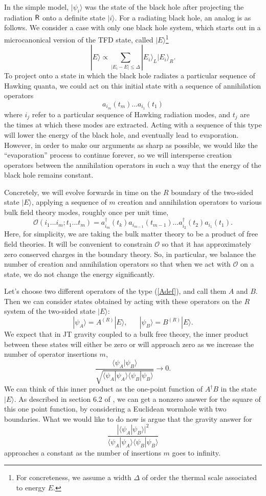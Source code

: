 \documentclass[11pt]{article}
\newcommand{\be}{\begin{equation}}
\newcommand{\ee}{\end{equation}}
\numberwithin{equation}{section}
\begin{document}
In the simple model, $|\psi_i\rangle$ was the state of the black hole after projecting the radiation $\sf{R}$ onto a definite state $|i\rangle$. For a radiating black hole, an analog is as follows. We consider a case with only one black hole system, which starts out in a microcanonical version of the TFD state, called $|E\rangle$\footnote{For concreteness, we assume a width $\Delta$ of order the thermal scale associated to energy $E$.}
\be
|E\rangle \propto \sum_{|E_i-E|\le \Delta}|E_i\rangle_L|E_i\rangle_{R}.
\ee
To project onto a state in which the black hole radiates a particular sequence of Hawking quanta, we could act on this initial state with a sequence of annihilation operators
\be
a_{i_m}(t_m)\dots a_{i_1}(t_1)
\ee
where $i_j$ refer to a particular sequence of Hawking radiation modes, and $t_j$ are the times at which these modes are extracted. Acting with a sequence of this type will lower the energy of the black hole, and eventually lead to evaporation. However, in order to make our arguments as sharp as possible, we would like the ``evaporation'' process to continue forever, so we will intersperse creation operators between the annihilation operators in such a way that the energy of the black hole remains constant.

Concretely, we will evolve forwards in time on the $R$ boundary of the two-sided state $|E\rangle$, applying a sequence of $m$ creation and annihilation operators to various bulk field theory modes, roughly once per unit time,
\be
\mathcal{O}(i_1\dots i_m;t_1\dots t_m) = a_{i_m}^\dagger(t_k) a_{i_{m-1}}(t_{m-1}) \dots a_{i_2}^\dagger(t_2) a_{i_1}(t_1).\label{Adef}
\ee
Here, for simplicity, we are taking the bulk matter theory to be a product of free field theories. It will be convenient to constrain $\mathcal{O}$ so that it has approximately zero conserved charges in the boundary theory. So, in particular, we balance the number of creation and annihilation operators so that when we act with $\mathcal{O}$ on a state, we do not change the energy significantly.

Let's choose two different operators of the type (\ref{Adef}), and call them $A$ and $B$. Then we can consider states obtained by acting with these operators on the $R$ system of the two-sided state $|E\rangle$:
\be
|\psi_A\rangle = A^{(R)}|E\rangle, \hspace{20pt} |\psi_B\rangle = B^{(R)}|E\rangle.
\ee
We expect that in JT gravity coupled to a bulk free theory, the inner product between these states will either be zero or will approach zero as we increase the number of operator insertions $m$,
\be
\frac{\langle \psi_A|\psi_B\rangle}{\sqrt{\langle \psi_A|\psi_A\rangle\langle \psi_B|\psi_B\rangle}} \to 0.
\ee
We can think of this inner product as the one-point function of $A^\dagger B$ in the state $|E\rangle$. As described in section 6.2 of \cite{Saad:2019pqd}, we can get a nonzero answer for the square of this one point function, by considering a Euclidean wormhole with two boundaries. What we would like to do now is argue that the gravity answer for
\be
\frac{|\langle \psi_A|\psi_B\rangle|^2}{\langle \psi_A|\psi_A\rangle\langle \psi_B|\psi_B\rangle}\label{numdenom}
\ee
approaches a constant as the number of insertions $m$ goes to infinity.
\end{document}
